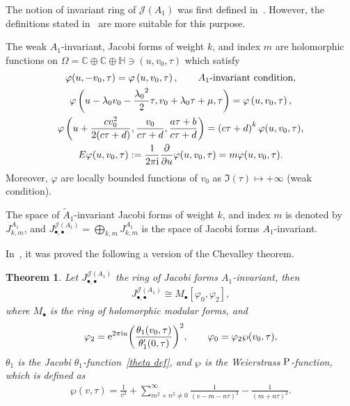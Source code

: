 \documentclass[10pt,a4paper]{amsart}
\numberwithin{equation}{section}
\newtheorem{Theorem}{Theorem}[section]
\newcommand{\Ja}{\mathcal{J}}
\begin{document}
The notion of invariant ring of $\Ja(A_1)$ was first defined in~\cite{M.EichlerandD.Zagier}. However, the definitions stated in~\cite{BertolaM.1, BertolaM.2, K.Wirthmuller} are more suitable for this purpose.
\begin{Definition}
\label{jacobi forms bertola}
The weak $ A_1$-invariant, Jacobi forms of weight $k$, and index $m$ are holomorphic functions on $\Omega=\mathbb{C}\oplus\mathbb{C}\oplus\mathbb{H}\ni (u,v_0,\tau)$ which satisfy
\begin{gather*}
\varphi(u,-v_0,\tau)=\varphi\left(u,v_0,\tau\right),\qquad \textrm{$A_1$-invariant condition},
\\
\varphi\left(u-\lambda_0v_0-\frac{{\lambda_0}^2}{2}\tau,v_0+\lambda_0\tau+\mu,\tau\right)
=\varphi\left(u,v_0,\tau\right),
\\
\varphi\left(u+\frac{cv_0^2}{2(c\tau+d)},\frac{v_0}{c\tau+d},\frac{a\tau+b}{c\tau+d}\right)
=\left(c\tau+d\right)^{k}\varphi(u,v_0,\tau),
\\
E\varphi(u,v_0,\tau):=\frac{1}{2\pi {\rm i}}\frac{\partial}{\partial u}\varphi(u,v_0,\tau)=m\varphi(u,v_0,\tau).
\end{gather*}
Moreover,
$\varphi$ are locally bounded functions of $v_0$ as $\Im(\tau)\mapsto +\infty$ (weak condition).

The space of $\tilde A_1$-invariant Jacobi forms of weight $k$, and index $m$ is denoted by $J_{k,m}^{A_1}$, and $J_{\bullet,\bullet}^{\Ja( A_1)}=\bigoplus _{k,m}J_{k,m}^{ A_1}$ is the space of Jacobi forms $ A_1$-invariant.
\end{Definition}
In~\cite{M.EichlerandD.Zagier}, it was proved the following a version of the Chevalley theorem.
\begin{Theorem}
Let $J_{\bullet,\bullet}^{\Ja( A_1)}$ the ring of Jacobi forms $ A_1$-invariant, then
\begin{gather*}
J_{\bullet,\bullet}^{\Ja( A_1)}\cong M_{\bullet}[\varphi_0,\varphi_2],
\end{gather*}
where $M_{\bullet}$ is the ring of holomorphic modular forms, and
\begin{gather*}
\varphi_2={\rm e}^{2\pi {\rm i} u}{\left(\frac{\theta_1(v_0,\tau)}{\theta_1^{\prime}(0,\tau)}\right)}^2,\qquad
\varphi_0=\varphi_2\wp(v_0,\tau),
\end{gather*}
 $\theta_1$ is the Jacobi $\theta_1$-function~\eqref{theta def}, and $\wp$ is the Weierstrass $\rm P$-function, which is defined as
\begin{gather}\label{Weiestrass P 0}
\wp(v,\tau)=\frac{1}{v^2}+\sum_{m^2+n^2\neq 0}^{\infty}\frac{1}{(v-m-n\tau)^2}-\frac{1}{(m+n\tau)^2}.
\end{gather}
\end{Theorem}
\end{document}
